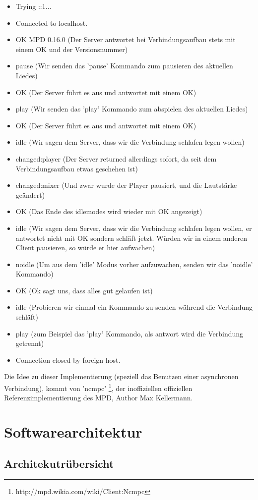 \begin{itemize}
	\item Trying ::1...
	\item Connected to localhost.
	\item OK MPD 0.16.0 (Der Server antwortet bei Verbindungsaufbau stets mit einem OK und der Versionsnummer)
	\item pause (Wir senden das 'pause' Kommando zum pausieren des aktuellen Liedes)
	\item OK (Der Server führt es aus und antwortet mit einem OK)
	\item play (Wir senden das 'play' Kommando zum abspielen des aktuellen Liedes)
	\item OK (Der Server führt es aus und antwortet mit einem OK)
	\item idle (Wir sagen dem Server, dass wir die Verbindung schlafen legen wollen)
	\item changed:player (Der Server returned allerdings sofort, da seit dem Verbindungsaufbau etwas geschehen ist)
	\item changed:mixer (Und zwar wurde der Player pausiert, und die Lautstärke geändert)
	\item OK (Das Ende des idlemodes wird wieder mit OK angezeigt)
	\item idle (Wir sagen dem Server, dass wir die Verbindung schlafen legen wollen, er antwortet nicht mit OK sondern schläft jetzt.
Würden wir in einem anderen Client pausieren, so würde er hier aufwachen)
	\item noidle (Um aus dem 'idle' Modus vorher aufzuwachen, senden wir das 'noidle' Kommando)
	\item OK (Ok sagt uns, dass alles gut gelaufen ist)
	\item idle (Probieren wir einmal ein Kommando zu senden während die Verbindung schläft)
	\item play (zum Beispiel das 'play' Kommando, als antwort wird die Verbindung getrennt)
	\item Connection closed by foreign host.
\end{itemize}
Die Idee zu dieser Implementierung (speziell das Benutzen einer asynchronen Verbindung), kommt von 'ncmpc' \footnote{http://mpd.wikia.com/wiki/Client:Ncmpc},
der inoffiziellen offiziellen Referenzimplementierung des MPD, Author Max Kellermann.
\section{Softwarearchitektur}
\subsection{Architekutrübersicht}
